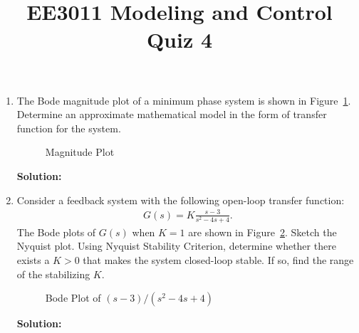 \documentclass{article}
\title{EE3011 Modeling and Control\\Quiz 4}
\date{}
\newlength\figureheight
\newlength\figurewidth
\newcommand{\tikzdir}[1]{tikz/#1.tikz}
\newcommand{\inputtikz}[1]{}}
\begin{document}
 \maketitle

\begin{enumerate}
\item The Bode magnitude plot of a minimum phase system is shown in Figure~\ref{fig:1}. Determine an approximate mathematical model in the form of transfer function for the system.
  \begin{figure}[ht]
\setlength\figureheight{8cm}
\setlength\figurewidth{14cm}
    \centering
    \inputtikz{Quiz25}
    \caption{Magnitude Plot\label{fig:1}}
  \end{figure}

  {\bf Solution:}
\newpage
\item Consider a feedback system with the following open-loop transfer function:
  \begin{align*}
    G(s) = K\frac{s-3}{s^2-4s+4}.
  \end{align*}
  The Bode plots of $G(s)$ when $K = 1$ are shown in Figure~\ref{fig:2}. Sketch the Nyquist plot. Using Nyquist Stability Criterion, determine whether there exists a $K > 0$ that makes the system closed-loop stable. If so, find the range of the stabilizing $K$.
  \begin{figure}[ht]
\setlength\figureheight{5cm}
\setlength\figurewidth{14cm}
    \centering
    \inputtikz{Quiz26}
    \caption{Bode Plot of $(s-3)/(s^2-4s+4)$\label{fig:2}}
  \end{figure}

  {\bf Solution:}
\end{enumerate}
\end{document}
